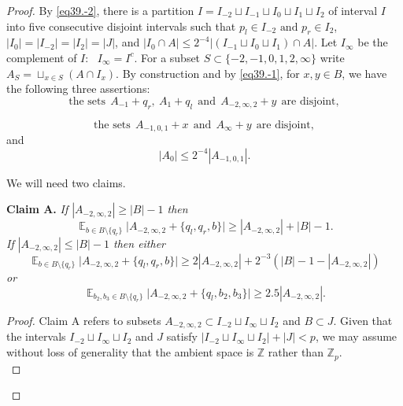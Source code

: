 \documentclass[12pt,reqno]{amsart}
\DeclareMathOperator*{\E}{\mathbb{E}}
\theoremstyle{definition}
\renewcommand\leq{\leqslant}
\renewcommand\geq{\geqslant}
\renewcommand\ge{\geqslant}
\begin{document}
\begin{proof}
By \eqref{eq39.-2}, there is a partition $I=I_{-2}\sqcup I_{-1}\sqcup I_0\sqcup I_1\sqcup I_2$ of interval $I$ into five consecutive disjoint intervals such that
$p_l \in I_{-2} \text{ and } p_r \in I_2$, \
$ |I_0|=|I_{-2}|= |I_{2}| = |J|$,
and
$ |I_0\cap A| \leq 2^{-4} |(I_{-1}\sqcup I_0 \sqcup I_1)\cap A|.$
Let $I_{\infty}$ be the complement of $I$: \ $I_{\infty}=I^c.$
For a subset $S\subset \{-2,-1,0,1,2, \infty\}$ write
$A_S=\sqcup_{x\in S}(A\cap I_x).$
By construction and by \eqref{eq39.-1}, for $x, y \in B$, we have the following three assertions:
\begin{equation}\label{eq39.1}
    \text{the sets} \ \  A_{-1}+q_r,\ A_1+q_l \ \ \text{and} \ \ A_{-2,\infty, 2}+y \ \ \text{are  disjoint},
\end{equation}

\begin{equation}\label{eq39.2}
    \text{the sets} \ \ A_{-1,0,1}+x \ \ \text{and} \ \  A_{\infty}+y \ \ \text{are  disjoint},
\end{equation}
and
\begin{equation}\label{eq39.25}
    |A_0| \leq 2^{-4}|A_{-1,0,1}|.
\end{equation}

\vspace{5pt}
We will need two claims.

\vspace{7pt}
{\bf Claim A. }{\em
If $|A_{-2,\infty,2}|\geq |B|-1$ then
$$\E_{b\in B \setminus \{q_r\}}\bigg|A_{-2,\infty,2}+\{q_l,q_r, b\} \bigg| \ge |A_{-2,\infty,2}|+|B|-1.$$
If $|A_{-2,\infty,2}|\leq |B|-1$ then either
$$\E_{b\in B \setminus \{q_r\}}\bigg|A_{-2,\infty,2}+\{q_l,q_r, b\} \bigg|  \ge 2|A_{-2,\infty,2}| + 2^{-3}(|B|-1-|A_{-2,\infty,2}|)$$
or
$$ \E_{b_2,b_3\in B \setminus \{q_r\}}\bigg|A_{-2,\infty,2}+\{q_l,b_2, b_3\} \bigg|  \ge 2.5|A_{-2,\infty,2}|.$$
}
\begin{proof}
Claim A refers to subsets $A_{-2,\infty,2}\subset I_{-2}\sqcup I_{\infty}\sqcup I_2$ and $B\subset J$. Given that the intervals $I_{-2}\sqcup I_{\infty}\sqcup I_2$ and $J$ satisfy $|I_{-2}\sqcup I_{\infty}\sqcup I_2|+|J|<p$, we may assume without loss of generality that the ambient space is $\mathbb{Z}$ rather than $\mathbb{Z}_p$.\\


\end{proof}
\end{proof}
\end{document}
